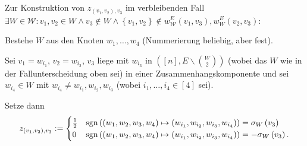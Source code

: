 \documentclass[10p,a4paper,BCOR = 12mm, DIV=15]{scrbook}
\begin{document}
\begin{Sa}
Zur Konstruktion von $z_{\left(v_1, v_2\right), v_3}$ im verbleibenden Fall 
$\exists W \in \mathcal{W}: v_1, v_2\in W \wedge v_3 \notin W \wedge \left\{v_1, v_2\right\} \notin w_{\mathcal{W}}^E\left(v_1, v_3\right), w_W^E\left(v_2, v_3\right)$:

Bestehe $W$ aus den Knoten $w_1, \ldots, w_4$ (Nummerierung beliebig, aber fest).

Sei $v_1 = w_{i_1}$, $v_2 = w_{i_2}$, $v_3$ liege mit $w_{i_3}$ in $\left(\left[n\right], E \backslash {W \choose 2}\right)$ (wobei das $W$ wie in der Fallunterscheidung oben sei) in einer Zusammenhangskomponente und sei $w_{i_4} \in W$ mit $w_{i_4} \neq w_{i_1}, w_{i_2}, w_{i_3}$ (wobei $i_1, \ldots, i_4 \in \left[4\right]$ sei).

Setze dann
\begin{displaymath}
z_{\left(v_1, v_2\right), v_3} := \begin{cases}
\frac{1}{2} & \operatorname{sgn} \left(\left(w_1, w_2, w_3, w_4\right) \mapsto \left(w_{i_1}, w_{i_2}, w_{i_3}, w_{i_4}\right)\right) = \sigma_W\left(v_3\right) \\
0 & \operatorname{sgn} \left(\left(w_1, w_2, w_3, w_4\right) \mapsto \left(w_{i_1}, w_{i_2}, w_{i_3}, w_{i_4}\right)\right) = -\sigma_W\left(v_3\right).
\end{cases}
\end{displaymath}
\end{Sa}
\end{document}
